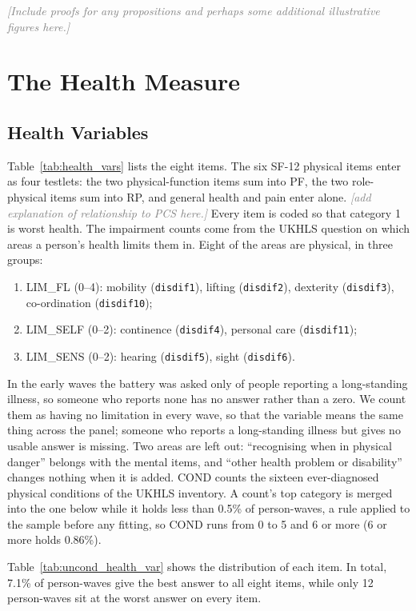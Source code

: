 \documentclass[11pt]{article}
\newcommand{\note}[1]{\textcolor{gray}{\textit{[#1]}}}
\newcommand{\code}[1]{\texttt{\small #1}}
\begin{document}
	\note{Include proofs for any propositions and perhaps some additional illustrative figures here.}


	\section{The Health Measure}
	\label{app:health}

	\subsection{Health Variables} \label{app:health_vars}

	Table~\ref{tab:health_vars} lists the eight items. The six SF-12 physical items enter as four testlets: the two physical-function items sum into PF, the two role-physical items sum into RP, and general health and pain enter alone. \note{add explanation of relationship to PCS here.} Every item is coded so that category 1 is worst health. The impairment counts come from the UKHLS question on which areas a person's health limits them in. Eight of the areas are physical, in three groups:
	\begin{enumerate}
		\item LIM\_FL (0--4): mobility (\code{disdif1}), lifting (\code{disdif2}), dexterity (\code{disdif3}), co-ordination (\code{disdif10});
		\item LIM\_SELF (0--2): continence (\code{disdif4}), personal care (\code{disdif11});
		\item LIM\_SENS (0--2): hearing (\code{disdif5}), sight (\code{disdif6}).
	\end{enumerate}
	In the early waves the battery was asked only of people reporting a long-standing illness, so someone who reports none has no answer rather than a zero. We count them as having no limitation in every wave, so that the variable means the same thing across the panel; someone who reports a long-standing illness but gives no usable answer is missing. Two areas are left out: ``recognising when in physical danger'' belongs with the mental items, and ``other health problem or disability'' changes nothing when it is added. COND counts the sixteen ever-diagnosed physical conditions of the UKHLS inventory. A count's top category is merged into the one below while it holds less than 0.5\% of person-waves, a rule applied to the sample before any fitting, so COND runs from 0 to 5 and 6 or more (6 or more holds 0.86\%).

	Table~\ref{tab:uncond_health_var} shows the distribution of each item. In total, 7.1\% of person-waves give the best answer to all eight items, while only 12 person-waves sit at the worst answer on every item.
\end{document}
